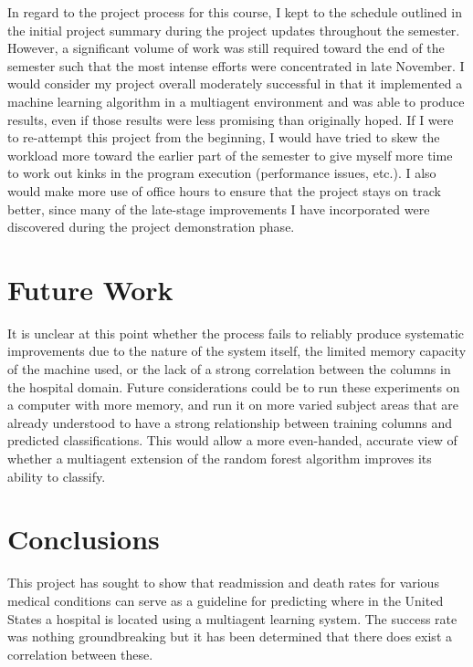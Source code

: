 \documentclass{article}
\begin{document}
\par In regard to the project process for this course, I kept to the schedule outlined in the initial project summary during the project updates throughout the semester. However, a significant volume of work was still required toward the end of the semester such that the most intense efforts were concentrated in late November. I would consider my project overall moderately successful in that it implemented a machine learning algorithm in a multiagent environment and was able to produce results, even if those results were less promising than originally hoped. If I were to re-attempt this project from the beginning, I would have tried to skew the workload more toward the earlier part of the semester to give myself more time to work out kinks in the program execution (performance issues, etc.). I also would make more use of office hours to ensure that the project stays on track better, since many of the late-stage improvements I have incorporated were discovered during the project demonstration phase.

\section{Future Work}

\par It is unclear at this point whether the process fails to reliably produce systematic improvements due to the nature of the system itself, the limited memory capacity of the machine used, or the lack of a strong correlation between the columns in the hospital domain. Future considerations could be to run these experiments on a computer with more memory, and run it on more varied subject areas that are already understood to have a strong relationship between training columns and predicted classifications. This would allow a more even-handed, accurate view of whether a multiagent extension of the random forest algorithm improves its ability to classify.

\section{Conclusions}

\par This project has sought to show that readmission and death rates for various medical conditions can serve as a guideline for predicting where in the United States a hospital is located using a multiagent learning system. The success rate was nothing groundbreaking but it has been determined that there does exist a correlation between these.
\end{document}
